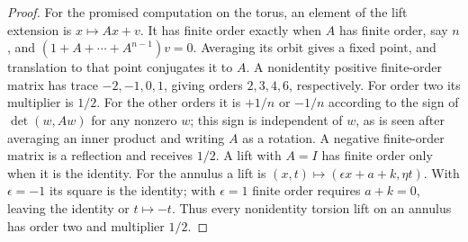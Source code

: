 \begin{proof}
For the promised computation on the torus, an element of the lift extension
is $x\mapsto Ax+v$. It has finite order exactly when $A$ has finite order,
say $n$, and $(1+A+\cdots+A^{n-1})v=0$. Averaging its orbit gives a fixed point,
and translation to that point conjugates it to $A$. A nonidentity positive
finite-order matrix has trace $-2,-1,0,1$, giving orders $2,3,4,6$, respectively.
For order two its multiplier is $1/2$. For the other orders it is $+1/n$ or
$-1/n$ according to the sign of $\det(w,Aw)$ for any nonzero $w$; this sign
is independent of $w$, as is seen after averaging an inner product and writing
$A$ as a rotation. A negative finite-order matrix is a reflection and receives
$1/2$. A lift with $A=I$ has finite order only when it is the identity.
For the annulus a lift is $(x,t)\mapsto(\epsilon x+a+k,\eta t)$. With
$\epsilon=-1$ its square is the identity; with $\epsilon=1$ finite order
requires $a+k=0$, leaving the identity or $t\mapsto-t$. Thus every nonidentity
torsion lift on an annulus has order two and multiplier $1/2$.
\end{proof}

